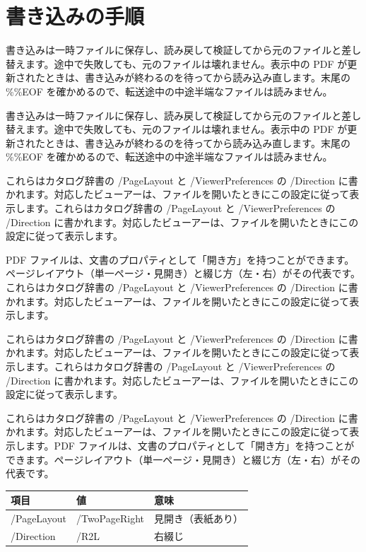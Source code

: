 \documentclass[a5paper,10pt]{ltjsarticle}
\begin{document}
\section{書き込みの手順}
書き込みは一時ファイルに保存し、読み戻して検証してから元のファイルと差し替えます。途中で失敗しても、元のファイルは壊れません。表示中の PDF が更新されたときは、書き込みが終わるのを待ってから読み込み直します。末尾の \%\%EOF を確かめるので、転送途中の中途半端なファイルは読みません。

書き込みは一時ファイルに保存し、読み戻して検証してから元のファイルと差し替えます。途中で失敗しても、元のファイルは壊れません。表示中の PDF が更新されたときは、書き込みが終わるのを待ってから読み込み直します。末尾の \%\%EOF を確かめるので、転送途中の中途半端なファイルは読みません。

これらはカタログ辞書の /PageLayout と /ViewerPreferences の /Direction に書かれます。対応したビューアーは、ファイルを開いたときにこの設定に従って表示します。これらはカタログ辞書の /PageLayout と /ViewerPreferences の /Direction に書かれます。対応したビューアーは、ファイルを開いたときにこの設定に従って表示します。

PDF ファイルは、文書のプロパティとして「開き方」を持つことができます。ページレイアウト（単一ページ・見開き）と綴じ方（左・右）がその代表です。これらはカタログ辞書の /PageLayout と /ViewerPreferences の /Direction に書かれます。対応したビューアーは、ファイルを開いたときにこの設定に従って表示します。

これらはカタログ辞書の /PageLayout と /ViewerPreferences の /Direction に書かれます。対応したビューアーは、ファイルを開いたときにこの設定に従って表示します。これらはカタログ辞書の /PageLayout と /ViewerPreferences の /Direction に書かれます。対応したビューアーは、ファイルを開いたときにこの設定に従って表示します。

これらはカタログ辞書の /PageLayout と /ViewerPreferences の /Direction に書かれます。対応したビューアーは、ファイルを開いたときにこの設定に従って表示します。PDF ファイルは、文書のプロパティとして「開き方」を持つことができます。ページレイアウト（単一ページ・見開き）と綴じ方（左・右）がその代表です。

\begin{center}\begin{tabular}{lll}\hline 項目 & 値 & 意味\\\hline
/PageLayout & /TwoPageRight & 見開き（表紙あり）\\ /Direction & /R2L & 右綴じ\\\hline\end{tabular}\end{center}
\end{document}
